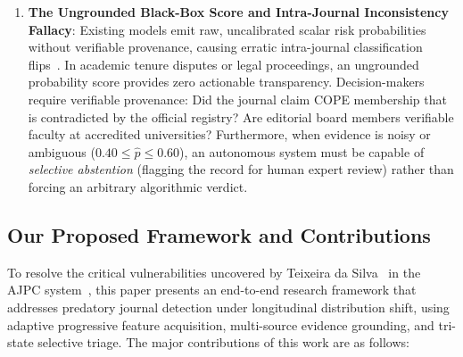 \documentclass[journal]{IEEEtran}
\begin{document}
\begin{enumerate}
    \item \textbf{The Ungrounded Black-Box Score and Intra-Journal Inconsistency Fallacy}: Existing models emit raw, uncalibrated scalar risk probabilities without verifiable provenance, causing erratic intra-journal classification flips~\cite{teixeira2025variation}. In academic tenure disputes or legal proceedings, an ungrounded probability score provides zero actionable transparency. Decision-makers require verifiable provenance: Did the journal claim COPE membership that is contradicted by the official registry? Are editorial board members verifiable faculty at accredited universities? Furthermore, when evidence is noisy or ambiguous ($0.40 \le \hat{p} \le 0.60$), an autonomous system must be capable of \textit{selective abstention} (flagging the record for human expert review) rather than forcing an arbitrary algorithmic verdict.
\end{enumerate}

\subsection{Our Proposed Framework and Contributions}
To resolve the critical vulnerabilities uncovered by Teixeira da Silva~\cite{teixeira2025variation} in the AJPC system~\cite{chen2023open}, this paper presents an end-to-end research framework that addresses predatory journal detection under longitudinal distribution shift, using adaptive progressive feature acquisition, multi-source evidence grounding, and tri-state selective triage. The major contributions of this work are as follows:
\end{document}
